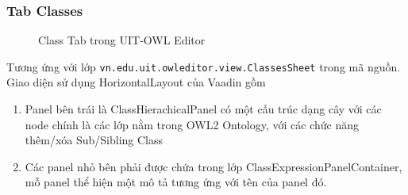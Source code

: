 \subsubsection{Tab Classes} 
\begin{figure}[h!]
	\centering
	\caption{Class Tab trong UIT-OWL Editor\label{overflow}}
\end{figure}
Tương ứng với lớp \verb|vn.edu.uit.owleditor.view.ClassesSheet| trong mã nguồn. Giao diện sử dụng HorizontalLayout của Vaadin gồm 
\begin{enumerate}
\item Panel bên trái là ClassHierachicalPanel có một cấu trúc dạng cây với các node chính là các lớp nằm trong OWL2 Ontology, với các chức năng thêm/xóa Sub/Sibling Class 
\item Các panel nhỏ bên phải được chứa trong lớp ClassExpressionPanelContainer, mỗ panel thể hiện một mô tả tương ứng với tên của panel đó.
\end{enumerate}	

